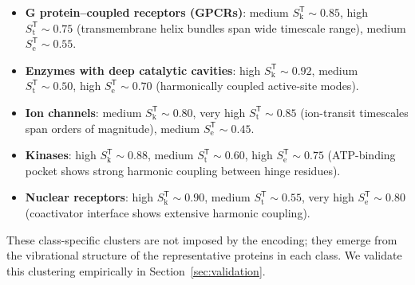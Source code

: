 \documentclass[11pt,twocolumn,a4paper]{article}
\theoremstyle{definition}
\theoremstyle{remark}
\newcommand{\Sk}{S_{\mathrm{k}}}
\newcommand{\St}{S_{\mathrm{t}}}
\newcommand{\Se}{S_{\mathrm{e}}}
\newcommand{\Target}{\mathsf{T}}
\begin{document}
\begin{itemize}[nosep,leftmargin=*]
\item \textbf{G protein--coupled receptors (GPCRs)}: medium $\Sk^\Target \sim 0.85$, high $\St^\Target \sim 0.75$ (transmembrane helix bundles span wide timescale range), medium $\Se^\Target \sim 0.55$.
\item \textbf{Enzymes with deep catalytic cavities}: high $\Sk^\Target \sim 0.92$, medium $\St^\Target \sim 0.50$, high $\Se^\Target \sim 0.70$ (harmonically coupled active-site modes).
\item \textbf{Ion channels}: medium $\Sk^\Target \sim 0.80$, very high $\St^\Target \sim 0.85$ (ion-transit timescales span orders of magnitude), medium $\Se^\Target \sim 0.45$.
\item \textbf{Kinases}: high $\Sk^\Target \sim 0.88$, medium $\St^\Target \sim 0.60$, high $\Se^\Target \sim 0.75$ (ATP-binding pocket shows strong harmonic coupling between hinge residues).
\item \textbf{Nuclear receptors}: high $\Sk^\Target \sim 0.90$, medium $\St^\Target \sim 0.55$, very high $\Se^\Target \sim 0.80$ (coactivator interface shows extensive harmonic coupling).
\end{itemize}

These class-specific clusters are not imposed by the encoding; they emerge from the vibrational structure of the representative proteins in each class. We validate this clustering empirically in Section~\ref{sec:validation}.
\end{document}
